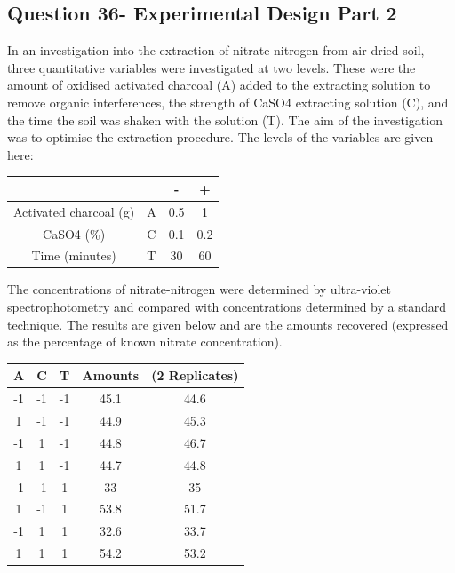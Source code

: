 \documentclass[a4paper,12pt]{article}
\begin{document}
\subsection*{Question 36-  Experimental Design Part 2 }

	In an investigation into the extraction of nitrate-nitrogen from air dried soil, three quantitative variables were investigated at two levels. These were the amount of oxidised activated charcoal (A) added to the extracting solution to remove organic interferences, the strength of CaSO4 extracting solution (C), and the time the soil was shaken with the solution (T). The aim of the investigation was to optimise the extraction procedure. The levels of the variables are given here:
	\begin{center}
		{
			\large
			\begin{tabular}{|cc|c|c|}
				\hline	&		&\phantom{sp}	{\LARGE -}\phantom{sp}	&	\phantom{sp} {\LARGE +} \phantom{sp}	\\ \hline
				Activated charcoal (g) 	&	A 	&	0.5	&	1	\\ \hline
				CaSO{4} (\%) 	&	C 	&	0.1	&	0.2	\\ \hline
				Time (minutes) 	&	T 	&	30	&	60	\\ \hline
			\end{tabular} 
		}
	\end{center}
	
	The concentrations of nitrate-nitrogen were determined by ultra-violet spectrophotometry and compared with concentrations determined by a standard technique. The results are given below and are the amounts recovered (expressed as the percentage of known nitrate concentration).
	{
		\large
		\begin{center}
			\begin{tabular}{|c|c|c|cc|}
				\hline
				\phantom{sp}A\phantom{sp}	&	\phantom{sp}C\phantom{sp}	&\phantom{sp}	T\phantom{sp}	&	Amounts&	(2 Replicates)	\\
				\hline
				-1	&	-1	&	-1	&	45.1	&	44.6	\\ \hline
				
				1	&	-1	&	-1	&	44.9	&	45.3	\\ \hline
				
				-1	&	1	&	-1	&	44.8	&	46.7	\\ \hline
				
				1	&	1	&	-1	&	44.7	&	44.8	\\ \hline
				
				-1	&	-1	&	1	&	33	&	35	\\ \hline
				
				1	&	-1	&	1	&	53.8	&	51.7	\\ \hline
				
				-1	&	1	&	1	&	32.6	&	33.7	\\ \hline							
				1	&	1	&	1	&	54.2	&	53.2	\\ \hline
			\end{tabular}
		\end{center}
	}
\end{document}
